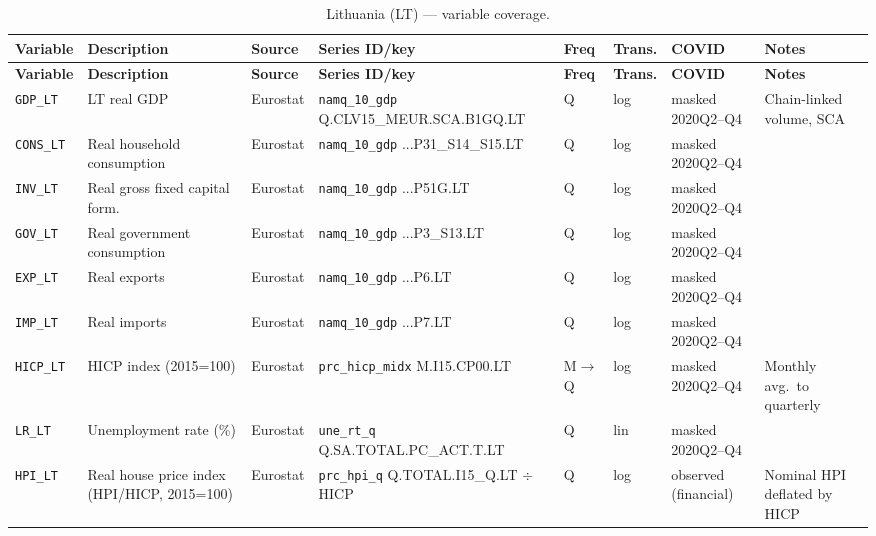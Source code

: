 {\footnotesize
\begin{longtable}{@{}p{1.9cm}p{2.9cm}p{1.5cm}p{2.7cm}p{0.7cm}p{1.0cm}p{1.6cm}p{2.4cm}@{}}
\caption{Lithuania (LT) --- variable coverage.}\label{tab:data:LT}\\
\toprule
\textbf{Variable} & \textbf{Description} & \textbf{Source} & \textbf{Series ID/key} & \textbf{Freq} & \textbf{Trans.} & \textbf{COVID} & \textbf{Notes} \\
\midrule \endfirsthead
\toprule
\textbf{Variable} & \textbf{Description} & \textbf{Source} & \textbf{Series ID/key} & \textbf{Freq} & \textbf{Trans.} & \textbf{COVID} & \textbf{Notes} \\
\midrule \endhead
\bottomrule \endfoot
\texttt{GDP\_LT}      & LT real GDP                       & Eurostat & \texttt{namq\_10\_gdp} Q.\allowbreak CLV15\_MEUR.\allowbreak SCA.\allowbreak B1GQ.\allowbreak LT       & Q & log & masked 2020Q2--Q4 & Chain-linked volume, SCA \\
\texttt{CONS\_LT}     & Real household consumption        & Eurostat & \texttt{namq\_10\_gdp} ...P31\_S14\_S15.LT             & Q & log & masked 2020Q2--Q4 & \\
\texttt{INV\_LT}      & Real gross fixed capital form.    & Eurostat & \texttt{namq\_10\_gdp} ...P51G.LT                      & Q & log & masked 2020Q2--Q4 & \\
\texttt{GOV\_LT}      & Real government consumption       & Eurostat & \texttt{namq\_10\_gdp} ...P3\_S13.LT                   & Q & log & masked 2020Q2--Q4 & \\
\texttt{EXP\_LT}      & Real exports                      & Eurostat & \texttt{namq\_10\_gdp} ...P6.LT                        & Q & log & masked 2020Q2--Q4 & \\
\texttt{IMP\_LT}      & Real imports                      & Eurostat & \texttt{namq\_10\_gdp} ...P7.LT                        & Q & log & masked 2020Q2--Q4 & \\
\texttt{HICP\_LT}     & HICP index (2015=100)             & Eurostat & \texttt{prc\_hicp\_midx} M.I15.CP00.LT                 & M$\to$Q & log & masked 2020Q2--Q4 & Monthly avg.\ to quarterly \\
\texttt{LR\_LT}       & Unemployment rate (\%)            & Eurostat & \texttt{une\_rt\_q} Q.SA.TOTAL.PC\_ACT.T.LT            & Q & lin & masked 2020Q2--Q4 & \\
\texttt{HPI\_LT}      & Real house price index (HPI/HICP, 2015=100) & Eurostat & \texttt{prc\_hpi\_q} Q.TOTAL.I15\_Q.LT $\div$ HICP & Q & log & observed (financial) & Nominal HPI deflated by HICP \\

\end{longtable}}
